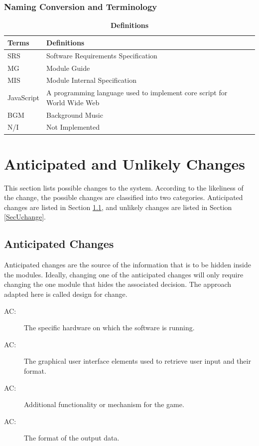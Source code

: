 \documentclass[12pt, titlepage]{article}
\newcounter{acnum}
\newcommand{\actheacnum}{AC\theacnum}
\begin{document}
\subsubsection{Naming Conversion and Terminology}
\begin{table}[!htbp]
\begin{tabularx}{\textwidth}{p{4cm}p{9cm}X}
\toprule {\bf Terms} & {\bf Definitions}\\
\midrule
SRS & Software Requirements Specification\\
MG & Module Guide\\
MIS & Module Internal Specification\\
JavaScript &  A programming language used to implement core script for World Wide Web\\
BGM & Background Music\\
N/I & Not Implemented\\
\bottomrule
\end{tabularx}
\caption{\bf Definitions}
\label{TblD}
\end{table}


\section{Anticipated and Unlikely Changes} \label{SecChange}

This section lists possible changes to the system. According to the likeliness
of the change, the possible changes are classified into two
categories. Anticipated changes are listed in Section \ref{SecAchange}, and
unlikely changes are listed in Section \ref{SecUchange}.

\subsection{Anticipated Changes} \label{SecAchange}

Anticipated changes are the source of the information that is to be hidden
inside the modules. Ideally, changing one of the anticipated changes will only
require changing the one module that hides the associated decision. The approach
adapted here is called design for
change.

\begin{description}
\item[ \actheacnum \label{acHardware}:] The specific
  hardware on which the software is running.
\item[ \actheacnum \label{acGUI}:] The graphical user interface elements used to retrieve user input and their format.
\item[ \actheacnum \label{acFucntion}:] Additional functionality or mechanism for the game.
\item[ \actheacnum \label{acOutput}:] The format of the output data.

\end{description}
\end{document}
